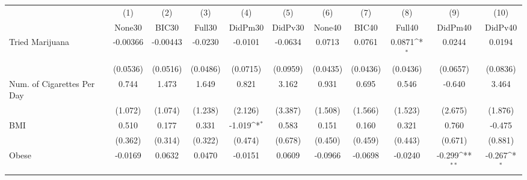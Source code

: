 {
\def\sym#1{\ifmmode^{#1}\else\(^{#1}\)\fi}
\begin{tabular}{l*{10}{c}}
\toprule
            &\multicolumn{1}{c}{(1)}&\multicolumn{1}{c}{(2)}&\multicolumn{1}{c}{(3)}&\multicolumn{1}{c}{(4)}&\multicolumn{1}{c}{(5)}&\multicolumn{1}{c}{(6)}&\multicolumn{1}{c}{(7)}&\multicolumn{1}{c}{(8)}&\multicolumn{1}{c}{(9)}&\multicolumn{1}{c}{(10)}\\
            &\multicolumn{1}{c}{None30}&\multicolumn{1}{c}{BIC30}&\multicolumn{1}{c}{Full30}&\multicolumn{1}{c}{DidPm30}&\multicolumn{1}{c}{DidPv30}&\multicolumn{1}{c}{None40}&\multicolumn{1}{c}{BIC40}&\multicolumn{1}{c}{Full40}&\multicolumn{1}{c}{DidPm40}&\multicolumn{1}{c}{DidPv40}\\
\midrule
Tried Marijuana&    -0.00366         &    -0.00443         &     -0.0230         &     -0.0101         &     -0.0634         &      0.0713         &      0.0761         &      0.0871\sym{*}  &      0.0244         &      0.0194         \\
            &    (0.0536)         &    (0.0516)         &    (0.0486)         &    (0.0715)         &    (0.0959)         &    (0.0435)         &    (0.0436)         &    (0.0436)         &    (0.0657)         &    (0.0836)         \\
\addlinespace
Num. of Cigarettes Per Day&       0.744         &       1.473         &       1.649         &       0.821         &       3.162         &       0.931         &       0.695         &       0.546         &      -0.640         &       3.464         \\
            &     (1.072)         &     (1.074)         &     (1.238)         &     (2.126)         &     (3.387)         &     (1.508)         &     (1.566)         &     (1.523)         &     (2.675)         &     (1.876)         \\
\addlinespace
BMI         &       0.510         &       0.177         &       0.331         &      -1.019\sym{*}  &       0.583         &       0.151         &       0.160         &       0.321         &       0.760         &      -0.475         \\
            &     (0.362)         &     (0.314)         &     (0.322)         &     (0.474)         &     (0.678)         &     (0.450)         &     (0.459)         &     (0.443)         &     (0.671)         &     (0.881)         \\
\addlinespace
Obese       &     -0.0169         &      0.0632         &      0.0470         &     -0.0151         &      0.0609         &     -0.0966         &     -0.0698         &     -0.0240         &      -0.299\sym{**} &      -0.267\sym{*}  \\

\end{tabular}}
